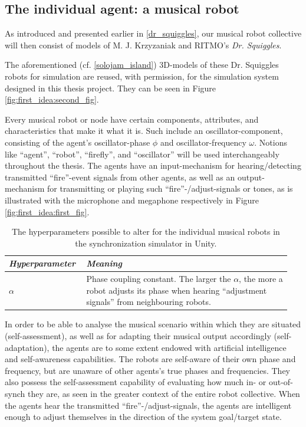 	\subsection{The individual agent: a musical robot}
	\label{subsec:agent}

	As introduced and presented earlier in \ref{dr_squiggles}, our musical robot collective will then consist of models of M. J. Krzyzaniak and RITMO's \textit{Dr. Squiggles}.
	
	The aforementioned (cf. \ref{solojam_island}) 3D-models of these Dr. Squiggles robots for simulation are reused, with permission, for the simulation system designed in this thesis project. They can be seen in Figure \ref{fig:first_idea:second_fig}.

	Every musical robot or node have certain components, attributes, and characteristics that make it what it is. Such include an oscillator-component, consisting of the agent's oscillator-phase $\phi$ and oscillator-frequency $\omega$. Notions like ``agent'', ``robot'', ``firefly'', and ``oscillator'' will be used interchangeably throughout the thesis. The agents have an input-mechanism for hearing/detecting transmitted ``fire''-event signals from other agents, as well as an output-mechanism for transmitting or playing such ``fire''-/adjust-signals or tones, as is illustrated with the microphone and megaphone respectively in Figure \ref{fig:first_idea:first_fig}.
	
	\begin{table}[ht]
		\centering
		\begin{tabular}{p{0.25\linewidth} | p{0.7\linewidth}}
		  \textit{\textbf{Hyperparameter}}  & \textit{\textbf{Meaning}} \\ \hline
		  $\alpha$ & Phase coupling constant. The larger the $\alpha$, the more a robot adjusts its phase when hearing ``adjustment signals'' from neighbouring robots.
		\end{tabular}
		\caption{The hyperparameters possible to alter for the individual musical robots in the synchronization simulator in Unity.}
		\label{tab:synchrony_robot_hyperparameters}
	\end{table}
	
	In order to be able to analyse the musical scenario within which they are situated (self-assessment), as well as for adapting their musical output accordingly (self-adaptation), the agents are to some extent endowed with artificial intelligence and self-awareness capabilities. The robots are self-aware of their own phase and frequency, but are unaware of other agents's true phases and frequencies. They also possess the self-assessment capability of evaluating how much in- or out-of-synch they are, as seen in the greater context of the entire robot collective. When the agents hear the transmitted ``fire''-/adjust-signals, the agents are intelligent enough to adjust themselves in the direction of the system goal/target state.

